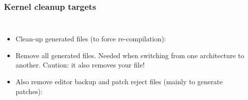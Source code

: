 \begin{frame}
  \frametitle{Kernel cleanup targets}
  \begin{columns}
    \begin{itemize}
    \item Clean-up generated files (to force re-compilation):\\
    \item Remove all generated files. Needed when switching from one
      architecture to another. Caution: it also removes your  file!\\
    \item Also remove editor backup and patch reject files (mainly to
      generate patches):\\
    \end{itemize}

\end{columns}
\end{frame}
